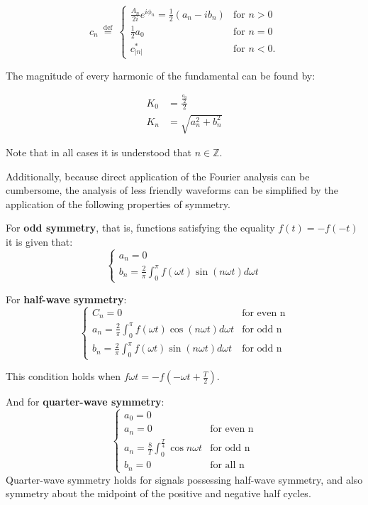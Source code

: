\begin{equation}
c_n \ \stackrel{\mathrm{def}}{=} \ \begin{cases}
\frac{A_n}{2i} e^{i\phi_n} = \frac{1}{2}(a_n - i b_n) & \text{for } n > 0 \\
\frac{1}{2}a_0 & \text{for }n = 0\\
c_{|n|}^*  & \text{for } n < 0.
\end{cases}
\end{equation}


The magnitude of every harmonic of the fundamental can be found by:

\begin{align*}
K_0 &= \frac{\frac{a_0}{2}}{2} \\
K_n &= \sqrt{a_n^2+b_n^2}
\end{align*}

Note that in all cases it is understood that $n\in \mathbb{Z}$.

Additionally, because direct application of the Fourier analysis can be cumbersome, the analysis of less friendly waveforms can be simplified by the application of the following properties of symmetry.

For \textbf{odd symmetry}, that is, functions satisfying the equality $f(t)=-f(-t)$ it is given that:
\begin{equation}
\begin{cases}
a_n = 0 \\ 
b_n = \frac{2}{\pi}\int_{0}^{\pi}f(\omega t)\sin(n\omega t)d\omega t
\end{cases}
\end{equation}

For \textbf{half-wave symmetry}:
\begin{equation} 
\begin{cases} 
C_n = 0 &\mbox{for even n}  \\ 
a_n = \frac{2}{\pi}\int_{0}^{\pi}f(\omega t)\cos(n\omega t)d\omega t &\mbox{for odd n}  \\
b_n = \frac{2}{\pi}\int_{0}^{\pi}f(\omega t)\sin(n\omega t)d\omega t &\mbox{for odd n} 
\end{cases}
\end{equation}

This condition holds when $f{\omega t} = -f(-\omega t + \frac{T}{2})$.

And for \textbf{quarter-wave symmetry}:
\begin{equation} 
\begin{cases} 
a_0 = 0 \\
a_n = 0 &\text{for even n}  \\
a_n = \frac{8}{T}\int_{0}^{\frac{T}{4}}\cos{n\omega t} &\mbox{for odd n}  \\
b_n = 0 &\mbox{for all n} 
\end{cases}
\end{equation}
Quarter-wave symmetry holds for signals possessing half-wave symmetry, and also symmetry about the midpoint of the positive and negative half cycles.

